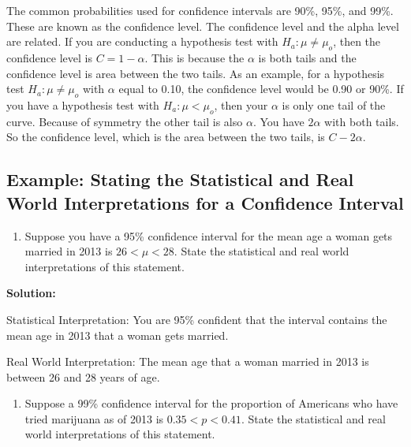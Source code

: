 \documentclass[
]{book}
\providecommand{\tightlist}{%
  \setlength{\itemsep}{0pt}\setlength{\parskip}{0pt}}
\begin{document}
The common probabilities used for confidence intervals are 90\%, 95\%, and 99\%. These are known as the confidence level. The confidence level and the alpha level are related. If you are conducting a hypothesis test with \(H_a:\mu\ne \mu_o\), then the confidence level is \(C=1-\alpha\). This is because the \(\alpha\) is both tails and the confidence level is area between the two tails. As an example, for a hypothesis test \(H_a:\mu\ne \mu_o\) with \(\alpha\) equal to 0.10, the confidence level would be 0.90 or 90\%. If you have a hypothesis test with \(H_a:\mu<\mu_o\), then your \(\alpha\) is only one tail of the curve. Because of symmetry the other tail is also \(\alpha\). You have \(2\alpha\) with both tails. So the confidence level, which is the area between the two tails, is \(C-2\alpha\).

\hypertarget{example-stating-the-statistical-and-real-world-interpretations-for-a-confidence-interval}{%
\subsection{Example: Stating the Statistical and Real World Interpretations for a Confidence Interval}\label{example-stating-the-statistical-and-real-world-interpretations-for-a-confidence-interval}}

\begin{enumerate}
\def\labelenumi{\alph{enumi}.}
\tightlist
\item
  Suppose you have a 95\% confidence interval for the mean age a woman gets married in 2013 is \(26<\mu<28\). State the statistical and real world interpretations of this statement.
\end{enumerate}

\textbf{Solution:}

Statistical Interpretation: You are 95\% confident that the interval contains the mean age in 2013 that a woman gets married.

Real World Interpretation: The mean age that a woman married in 2013 is between 26 and 28 years of age.

\begin{enumerate}
\def\labelenumi{\alph{enumi}.}
\setcounter{enumi}{1}
\tightlist
\item
  Suppose a 99\% confidence interval for the proportion of Americans who have tried marijuana as of 2013 is \(0.35<p<0.41\). State the statistical and real world interpretations of this statement.
\end{enumerate}
\end{document}
